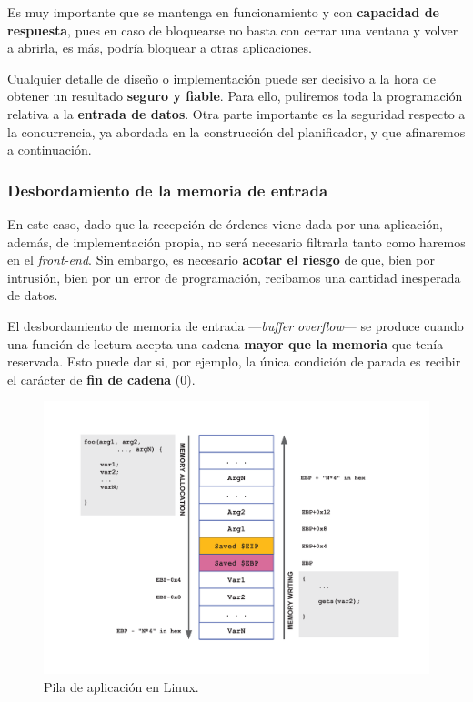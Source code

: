 Es muy importante que se mantenga en funcionamiento y con \textbf{capacidad de respuesta}, pues en caso de bloquearse no basta con cerrar una ventana y volver a abrirla, es más, podría bloquear a otras aplicaciones.

Cualquier detalle de diseño o implementación puede ser decisivo a la hora de obtener un resultado \textbf{seguro y fiable}. Para ello, puliremos toda la programación relativa a la \textbf{entrada de datos}. Otra parte importante es la seguridad respecto a la concurrencia, ya abordada en la construcción del planificador, y que afinaremos a continuación.

\subsubsection{Desbordamiento de la memoria de entrada}

En este caso, dado que la recepción de órdenes viene dada por una aplicación, además, de implementación propia, no será necesario filtrarla tanto como haremos en el \textit{front-end}. Sin embargo, es necesario \textbf{acotar el riesgo} de que, bien por intrusión, bien por un error de programación, recibamos una cantidad inesperada de datos.

El desbordamiento de memoria de entrada ---\textit{buffer overflow}--- se produce cuando una función de lectura acepta una cadena \textbf{mayor que la memoria} que tenía reservada. Esto puede dar si, por ejemplo, la única condición de parada es recibir el carácter de \textbf{fin de cadena} (0).

\smallskip

\begin{figure}[H]
	\noindent \begin{centering}
		\includegraphics[width=\linewidth]{capitulo5/stack}
		\par\end{centering}
	\smallskip
	\caption[Pila de aplicación en Linux]{\label{fig:stack} Pila de aplicación en Linux. \cite{zanero_cs}}
\end{figure} 


